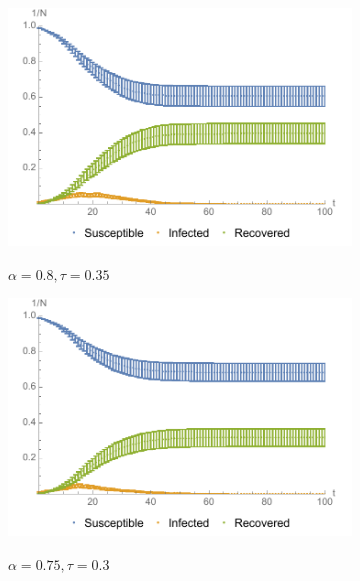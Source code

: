 \documentclass[11pt]{article}
\begin{document}
\begin{figure}[t]
	\centering
	\begin{subfigure}[b]{0.49\textwidth}
    	\includegraphics[width=\textwidth]{sir_alpha08_tau035_omega1_beta05_gamma03_expk2_runs50_notitle.pdf}
        \label{fig:sir_8035}
        \caption{$\alpha=0.8, \tau=0.35$}
	\end{subfigure}
	\begin{subfigure}[b]{0.49\textwidth}
    	\includegraphics[width=\textwidth]{sir_alpha075_tau03_omega1_beta05_gamma03_expk2_runs50_notitle.pdf}
        \label{fig:sir_7530}
        \caption{$\alpha=0.75, \tau=0.3$}
	\end{subfigure}
	\begin{subfigure}[b]{0.49\textwidth}

\end{subfigure}
\end{figure}
\end{document}
